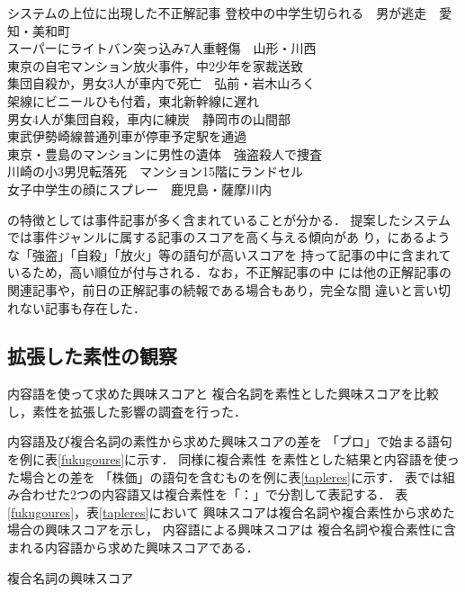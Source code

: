 \documentclass[japanese]{jnlp_1.4}
\newcounter{ex}
\def\ex#1{}
\def\exref#1{}
\begin{document}
\begin{itembox}{\ex{}\label{err2}システムの上位に出現した不正解記事}
登校中の中学生切られる　男が逃走　愛知・美和町\\
スーパーにライトバン突っ込み7人重軽傷　山形・川西\\
東京の自宅マンション放火事件，中2少年を家裁送致\\
集団自殺か，男女3人が車内で死亡　弘前・岩木山ろく\\
架線にビニールひも付着，東北新幹線に遅れ\\
男女4人が集団自殺，車内に練炭　静岡市の山間部\\
東武伊勢崎線普通列車が停車予定駅を通過\\
東京・豊島のマンションに男性の遺体　強盗殺人で捜査\\
川崎の小3男児転落死　マンション15階にランドセル\\
女子中学生の顔にスプレー　鹿児島・薩摩川内
\end{itembox}

\exref{err2}の特徴としては事件記事が多く含まれていることが分かる．
提案したシステムでは事件ジャンルに属する記事のスコアを高く与える傾向があ
り，\exref{err2}にあるような「強盗」「自殺」「放火」等の語句が高いスコアを
持って記事の中に含まれているため，高い順位が付与される．なお，不正解記事の中
には他の正解記事の関連記事や，前日の正解記事の続報である場合もあり，完全な間
違いと言い切れない記事も存在した．


\subsection{拡張した素性の観察}

内容語を使って求めた興味スコアと
複合名詞を素性とした興味スコアを比較し，素性を拡張した影響の調査を行った．

内容語及び複合名詞の素性から求めた興味スコアの差を
「プロ」で始まる語句を例に表\ref{fukugoures}に示す．
同様に複合素性
を素性とした結果と内容語を使った場合との差を
「株価」の語句を含むものを例に表\ref{tapleres}に示す．
表では組み合わせた2つの内容語又は複合素性を「：」で分割して表記する．
表\ref{fukugoures}，表\ref{tapleres}において
興味スコアは複合名詞や複合素性から求めた場合の興味スコアを示し，
内容語による興味スコアは
複合名詞や複合素性に含まれる内容語から求めた興味スコアである．

\begin{table}[b]
\caption{複合名詞の興味スコア}

\label{fukugoures}
\end{table}
\end{document}
